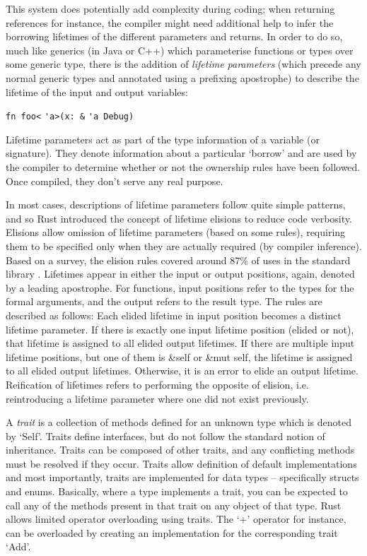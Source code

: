This system does potentially add complexity during coding; when returning references for instance, the compiler might need additional help to infer the borrowing lifetimes of the different parameters and returns. In order to do so, much like generics (in Java or C++) which parameterise functions or types over some generic type, there is the addition of \textit{lifetime parameters} (which precede any normal generic types and annotated using a prefixing apostrophe) to describe the lifetime of the input and output variables:

{\verb|fn foo<|}{\color{blue} \verb|'a|}{\verb|>(x: &|}
{\color{blue} \verb|'a|}{\verb| Debug)|}

Lifetime parameters act as part of the type information of a variable (or signature). They denote information about a particular `borrow' and are used by the compiler to determine whether or not the ownership rules have been followed. Once compiled, they don't serve any real purpose.

In most cases, descriptions of lifetime parameters follow quite simple patterns, and so Rust introduced the concept of lifetime elisions to reduce code verbosity. Elisions allow omission of lifetime parameters (based on some rules), requiring them to be specified only when they are actually required (by compiler inference). Based on a survey, the elision rules covered around 87\% of uses in the standard library \cite{elisionrules}. Lifetimes appear in either the input or output positions, again, denoted by a leading apostrophe. For functions, input positions refer to the types for the formal arguments, and the output refers to the result type. The rules are described as follows: Each elided lifetime in input position becomes a distinct lifetime parameter. If there is exactly one input lifetime position (elided or not), that lifetime is assigned to all elided output lifetimes. If there are multiple input lifetime positions, but one of them is \&self or \&mut self, the lifetime is assigned to all elided output lifetimes. Otherwise, it is an error to elide an output lifetime.  Reification of lifetimes refers to performing the opposite of elision, i.e. reintroducing a lifetime parameter where one did not exist previously.

A \textit{trait} is a collection of methods defined for an unknown type which is denoted by `Self'. Traits define interfaces, but do not follow the standard notion of inheritance. Traits can be composed of other traits, and any conflicting methods must be resolved if they occur. Traits allow definition of default implementations and most importantly, traits are implemented for data types -- specifically structs and enums. Basically, where a type implements a trait, you can be expected to call any of the methods present in that trait on any object of that type. Rust allows limited operator overloading using traits. The `+' operator for instance, can be overloaded by creating an implementation for the corresponding trait `Add'.

